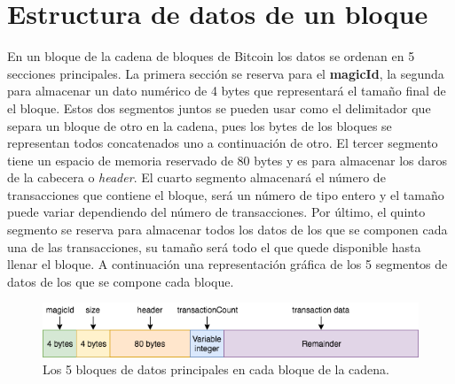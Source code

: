 \documentclass{article}
\begin{document}
\section{Estructura de datos de un bloque}
    
    \vspace{3mm}
    
     En un bloque de la cadena de bloques de Bitcoin los datos se ordenan en 5 secciones principales. La primera sección se reserva para el \textbf{magicId}, la segunda para almacenar un dato numérico de 4 bytes que representará el tamaño final de el bloque. Estos dos segmentos juntos se pueden usar como el delimitador que separa un bloque de otro en la cadena, pues los bytes de los bloques se representan todos concatenados uno a continuación de otro. El tercer segmento tiene un espacio de memoria reservado de 80 bytes y es para almacenar los daros de la cabecera o \textit{header}. El cuarto segmento almacenará el número de transacciones que contiene el bloque, será un número de tipo entero y el tamaño puede variar dependiendo del número de transacciones. Por último, el quinto segmento se reserva para almacenar todos los datos de los que se componen cada una de las transacciones, su tamaño será todo el que quede disponible hasta llenar el bloque. A continuación una representación gráfica de los 5 segmentos de datos de los que se compone cada bloque.
    
    \begin{figure}[H]
    \centering
        \includegraphics[scale=0.57]{img/Bitcoin_SHA_256-Block_data}
        \caption{Los 5 bloques de datos principales en cada bloque de la cadena.}
    \end{figure}
    
\end{document}
